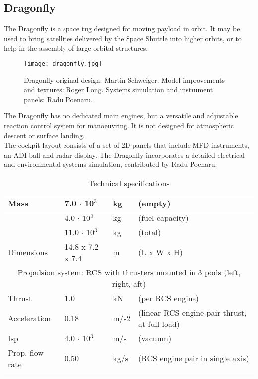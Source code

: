 \documentclass[Orbiter User Manual.tex]{subfiles}
\begin{document}
\subsection{Dragonfly}
The Dragonfly is a space tug designed for moving payload in orbit. It may be used to bring satellites delivered by the Space Shuttle into higher orbits, or to help in the assembly of large orbital structures.

\begin{figure}[H]
  \centering
  \texttt{[image: dragonfly.jpg]}
  \caption{Dragonfly original design: Martin Schweiger. Model improvements and textures: Roger Long. Systems simulation and instrument panels: Radu Poenaru.}
\end{figure}

\noindent
The Dragonfly has no dedicated main engines, but a versatile and adjustable reaction control system for manoeuvring. It is not designed for atmospheric descent or surface landing.\\
The cockpit layout consists of a set of 2D panels that include MFD instruments, an ADI ball and radar display. The Dragonfly incorporates a detailed electrical and environmental systems simulation, contributed by Radu Poenaru.

	\begin{longtable}{ |p{}|p{}|p{}|p{}| }
	\hline\rule{0pt}{2ex}
	Mass & 7.0 $\cdot$ 10$^{3}$ & kg & (empty)\\
	\hline\rule{0pt}{2ex}
	& 4.0 $\cdot$ 10$^{3}$ & kg & (fuel capacity)\\
	\hline\rule{0pt}{2ex}
	& 11.0 $\cdot$ 10$^{3}$ & kg & (total)\\
	\hline\rule{0pt}{2ex}
	Dimensions & 14.8 x 7.2 x 7.4 & m & (L x W x H)\\
	\hline
	\multicolumn{4}{|c|}{\rule{0pt}{2ex}Propulsion system: RCS with thrusters mounted in 3 pods (left, right, aft)}\\
	\hline\rule{0pt}{2ex}
	Thrust & 1.0 & kN & (per RCS engine)\\
	\hline\rule{0pt}{2ex}
	Acceleration & 0.18 & m/s2 & (linear RCS engine pair thrust, at full load)\\
	\hline\rule{0pt}{2ex}
	Isp & 4.0 $\cdot$ 10$^{3}$ & m/s & (vacuum)\\
	\hline\rule{0pt}{2ex}
	Prop. flow rate & 0.50 & kg/s & (RCS engine pair in single axis)\\
	\hline
	\caption{Technical specifications}
	\end{longtable}
\end{document}
